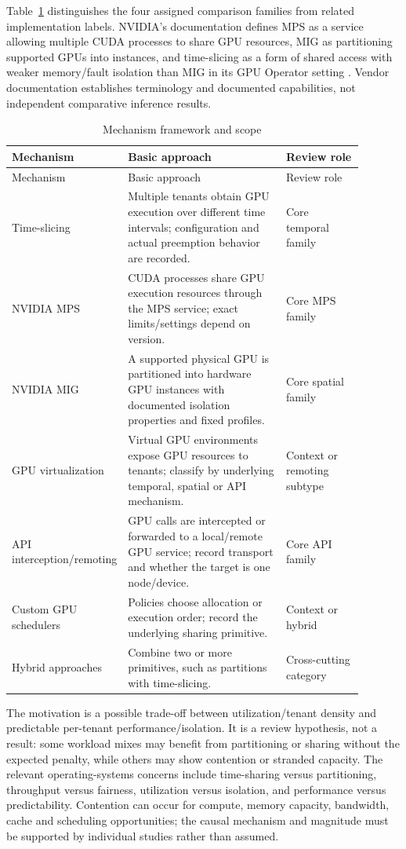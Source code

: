 \documentclass[12pt,a4paper]{article}
\begin{document}
Table~\ref{tab:mechanisms} distinguishes the four assigned comparison families from related implementation labels. NVIDIA's documentation defines MPS as a service allowing multiple CUDA processes to share GPU resources, MIG as partitioning supported GPUs into instances, and time-slicing as a form of shared access with weaker memory/fault isolation than MIG in its GPU Operator setting \cite{nvidiaMPS,nvidiaMIG,nvidiaTime}. Vendor documentation establishes terminology and documented capabilities, not independent comparative inference results.

\begin{longtable}{p{0.22\linewidth}p{0.45\linewidth}p{0.22\linewidth}}
\caption{Mechanism framework and scope}\label{tab:mechanisms}\\\toprule
Mechanism & Basic approach & Review role\\\midrule\endfirsthead
\toprule Mechanism & Basic approach & Review role\\\midrule\endhead
Time-slicing & Multiple tenants obtain GPU execution over different time intervals; configuration and actual preemption behavior are recorded. & Core temporal family\\
NVIDIA MPS & CUDA processes share GPU execution resources through the MPS service; exact limits/settings depend on version. & Core MPS family\\
NVIDIA MIG & A supported physical GPU is partitioned into hardware GPU instances with documented isolation properties and fixed profiles. & Core spatial family\\
GPU virtualization & Virtual GPU environments expose GPU resources to tenants; classify by underlying temporal, spatial or API mechanism. & Context or remoting subtype\\
API interception/remoting & GPU calls are intercepted or forwarded to a local/remote GPU service; record transport and whether the target is one node/device. & Core API family\\
Custom GPU schedulers & Policies choose allocation or execution order; record the underlying sharing primitive. & Context or hybrid\\
Hybrid approaches & Combine two or more primitives, such as partitions with time-slicing. & Cross-cutting category\\\bottomrule
\end{longtable}

The motivation is a possible trade-off between utilization/tenant density and predictable per-tenant performance/isolation. It is a review hypothesis, not a result: some workload mixes may benefit from partitioning or sharing without the expected penalty, while others may show contention or stranded capacity. The relevant operating-systems concerns include time-sharing versus partitioning, throughput versus fairness, utilization versus isolation, and performance versus predictability. Contention can occur for compute, memory capacity, bandwidth, cache and scheduling opportunities; the causal mechanism and magnitude must be supported by individual studies rather than assumed.
\end{document}
